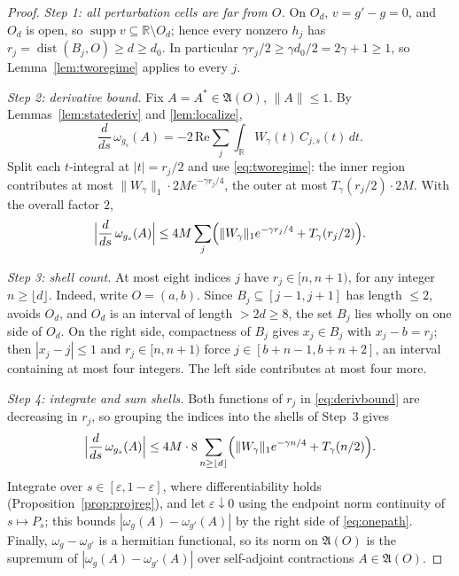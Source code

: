 \documentclass[11pt,a4paper]{article}
\theoremstyle{plain}
\theoremstyle{definition}
\theoremstyle{plain}
\theoremstyle{definition}
\newcommand{\R}{\mathbb{R}}
\newcommand{\A}{\mathfrak{A}}
\DeclareMathOperator{\supp}{supp}
\DeclareMathOperator{\dist}{dist}
\begin{document}
\begin{proof}
\emph{Step 1: all perturbation cells are far from $O$.} On $O_d$, $v=g'-g=0$, and $O_d$ is
open, so $\supp v\subseteq\R\setminus O_d$; hence every nonzero $h_j$ has
$r_j=\dist(B_j,O)\ge d\ge d_0$. In particular
$\gamma r_j/2\ge\gamma d_0/2=2\gamma+1\ge1$, so Lemma~\ref{lem:tworegime} applies to every
$j$.

\emph{Step 2: derivative bound.} Fix $A=A^*\in\A(O)$, $\|A\|\le1$. By
Lemmas~\ref{lem:statederiv} and \ref{lem:localize},
\[
 \frac d{ds}\,\omega_{g_s}(A)
 =-2\,\mathrm{Re}\sum_j\int_\R W_\gamma(t)\,C_{j,s}(t)\,dt .
\]
Split each $t$-integral at $|t|=r_j/2$ and use \eqref{eq:tworegime}: the inner region
contributes at most $\|W_\gamma\|_1\cdot2Me^{-\gamma r_j/4}$, the outer at most
$T_\gamma(r_j/2)\cdot2M$. With the overall factor $2$,
\begin{equation}
 \Bigl|\frac d{ds}\,\omega_{g_s}(A)\Bigr|
 \le4M\sum_j\Bigl(\|W_\gamma\|_1e^{-\gamma r_j/4}+T_\gamma(r_j/2)\Bigr) .
 \label{eq:derivbound}
\end{equation}

\emph{Step 3: shell count.} At most eight indices $j$ have $r_j\in[n,n+1)$, for any
integer $n\ge\lfloor d\rfloor$. Indeed, write $O=(a,b)$. Since $B_j\subseteq[j-1,j+1]$ has
length $\le2$, avoids $O_d$, and $O_d$ is an interval of length $>2d\ge8$, the set $B_j$
lies wholly on one side of $O_d$. On the right side, compactness of $B_j$ gives
$x_j\in B_j$ with $x_j-b=r_j$; then $|x_j-j|\le1$ and $r_j\in[n,n+1)$ force
$j\in[b+n-1,b+n+2]$, an interval containing at most four integers. The left side
contributes at most four more.

\emph{Step 4: integrate and sum shells.} Both functions of $r_j$ in
\eqref{eq:derivbound} are decreasing in $r_j$, so grouping the indices into the shells of
Step~3 gives
\[
 \Bigl|\frac d{ds}\,\omega_{g_s}(A)\Bigr|
 \le4M\cdot8\sum_{n\ge\lfloor d\rfloor}
 \Bigl(\|W_\gamma\|_1e^{-\gamma n/4}+T_\gamma(n/2)\Bigr) .
\]
Integrate over $s\in[\varepsilon,1-\varepsilon]$, where differentiability holds
(Proposition~\ref{prop:projreg}), and let $\varepsilon\downarrow0$ using the endpoint norm
continuity of $s\mapsto P_s$; this bounds $|\omega_g(A)-\omega_{g'}(A)|$ by the right side
of \eqref{eq:onepath}. Finally, $\omega_g-\omega_{g'}$ is a hermitian functional, so its
norm on $\A(O)$ is the supremum of $|\omega_g(A)-\omega_{g'}(A)|$ over self-adjoint
contractions $A\in\A(O)$.
\end{proof}
\end{document}
